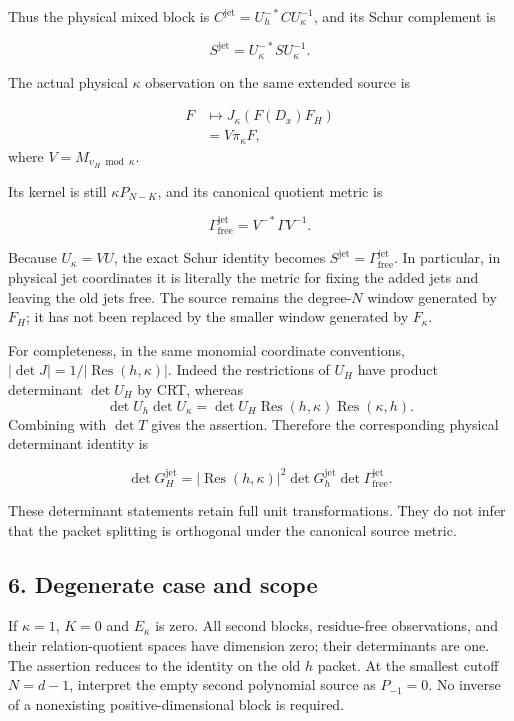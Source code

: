 Thus the physical mixed block is
\(C^{\mathrm{jet}}=U_h^{-*}CU_\kappa^{-1}\), and its Schur complement is

\[S^{\mathrm{jet}}=U_\kappa^{-*}SU_\kappa^{-1}.\]

The actual physical \(\kappa\) observation on the same extended source is

\[\begin{aligned}F&\longmapsto J_\kappa(F(D_x)F_H)\\
&=V\pi_\kappa F,\end{aligned}\]\noindent where \(V=M_{\upsilon_H\bmod\kappa}\).

Its kernel is still \(\kappa P_{N-K}\), and its canonical quotient metric is

\[\Gamma_{\mathrm{free}}^{\mathrm{jet}}=V^{-*}\Gamma V^{-1}.\]

Because \(U_\kappa=VU\), the exact Schur identity becomes
\(S^{\mathrm{jet}}=\Gamma_{\mathrm{free}}^{\mathrm{jet}}\). In particular, in physical jet coordinates it
is literally the metric for fixing the added jets and leaving the old
jets free. The source remains the degree-\(N\) window generated by \(F_H\);
it has not been replaced by the smaller window generated by \(F_\kappa\).

For completeness, in the same monomial coordinate conventions,
\(|\det J|=1/|\operatorname{Res}(h,\kappa)|\). Indeed the restrictions of \(U_H\) have product
determinant \(\det U_H\) by CRT, whereas
\[\det U_h\det U_\kappa=\det U_H\operatorname{Res}(h,\kappa)\operatorname{Res}(\kappa,h).\]
Combining with \(\det T\) gives the assertion. Therefore the corresponding
physical determinant identity is

\[\det G_H^{\mathrm{jet}}=|\operatorname{Res}(h,\kappa)|^2\det G_h^{\mathrm{jet}}\det\Gamma_{\mathrm{free}}^{\mathrm{jet}}.\]

These determinant statements retain full unit transformations. They do
not infer that the packet splitting is orthogonal under the canonical
source metric.

\subsection*{6. Degenerate case and scope}

If \(\kappa=1\), \(K=0\) and \(E_\kappa\) is zero. All second blocks, residue-free
observations, and their relation-quotient spaces have dimension zero;
their determinants are one. The assertion reduces to the identity on
the old \(h\) packet. At the smallest cutoff \(N=d-1\), interpret the empty
second polynomial source as \(P_{-1}=0\). No inverse of a nonexisting
positive-dimensional block is required.


